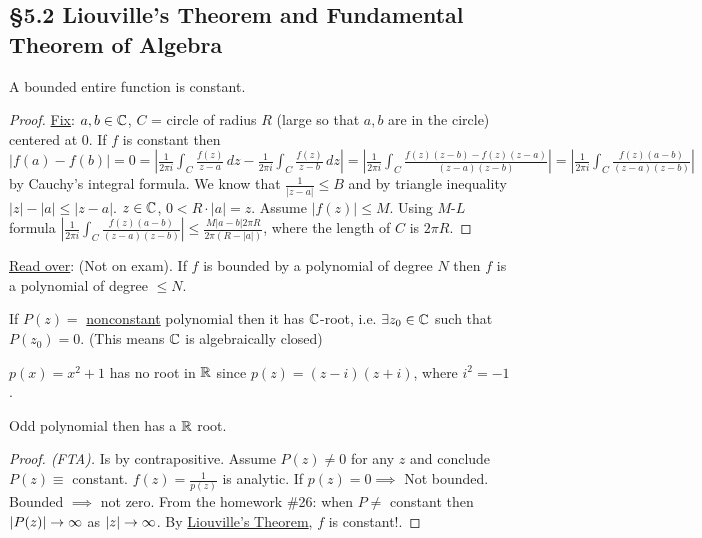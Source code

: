 \documentclass[]{article}
\begin{document}
\subsection{\S5.2 Liouville's Theorem and Fundamental Theorem of Algebra}
\begin{theorem}
	 A bounded entire function is constant.
\end{theorem}
\begin{proof}
	\underline{Fix}: $a,b\in\mathbb{C}$, $C$ = circle of radius $R$ (large so that $a,b$ are in the circle) centered at 0. If $f$ is constant then $|f(a)-f(b)| = 0 = \left|\frac{1}{2\pi i} \int_C \frac{f(z)}{z-a} \, dz - \frac{1}{2\pi i} \int_C \frac{f(z)}{z-b}\, dz \right| = \left| \frac{1}{2\pi i} \int_C \frac{f(z)(z-b) - f(z)(z-a)}{(z-a)(z-b)} \right| = \left| \frac{1}{2\pi i} \int_C \frac{f(z)(a-b)}{(z-a)(z-b)} \right|$ by Cauchy's integral formula. We know that $\frac{1}{|z-a|}\leq B$ and by triangle inequality $|z|-|a|\leq |z-a|$. $z\in\mathbb{C}$, $0<R\cdot |a| = z$. Assume $|f(z)|\leq M$. Using $M$-$L$ formula $\left| \frac{1}{2\pi i} \int_C \frac{f(z)(a-b)}{(z-a)(z-b)} \right| \leq \frac{M|a-b|2\pi R}{2\pi(R-|a|)}$, where the length of $C$ is $2\pi R$.
\end{proof}
\begin{theorem}
	 \underline{Read over}: (Not on exam). If $f$ is bounded by a polynomial of degree $N$ then $f$ is a polynomial of degree $\leq N$.
\end{theorem}
\begin{theorem}
	 If $P(z) = $ \underline{nonconstant} polynomial then it has $\mathbb{C}$-root, i.e. $\exists z_0\in\mathbb{C}$ such that $P(z_0) = 0$. (This means $\mathbb{C}$ is algebraically closed)
\end{theorem}
\begin{example}
	$p(x) = x^2+1$ has no root in $\mathbb{R}$ since $p(z) = (z-i)(z+i)$, where $i^2=-1$.
\end{example}
\begin{theorem}
	Odd polynomial then has a $\mathbb{R}$ root.
\end{theorem}
\begin{proof}
	[Proof. (FTA)] Is by contrapositive. Assume $P(z)\neq 0$ for any $z$ and conclude $P(z) \equiv $ constant. $f(z) = \frac{1}{p(z)}$ is analytic. If $p(z)=0 \implies $ Not bounded. Bounded $\implies$ not zero. From the homework \#26: when $P\neq$ constant then $|P(z)|\rightarrow \infty$ as $|z|\rightarrow\infty $. By \underline{Liouville's Theorem}, $f$ is constant!.
\end{proof}
\end{document}
